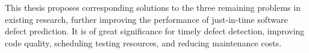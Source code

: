 \begin{englishabstract}
This thesis proposes corresponding solutions to the three remaining problems in existing research, further improving the performance of just-in-time software defect prediction. It is of great significance for timely defect detection, improving code quality, scheduling testing resources, and reducing maintenance costs.





\end{englishabstract}


